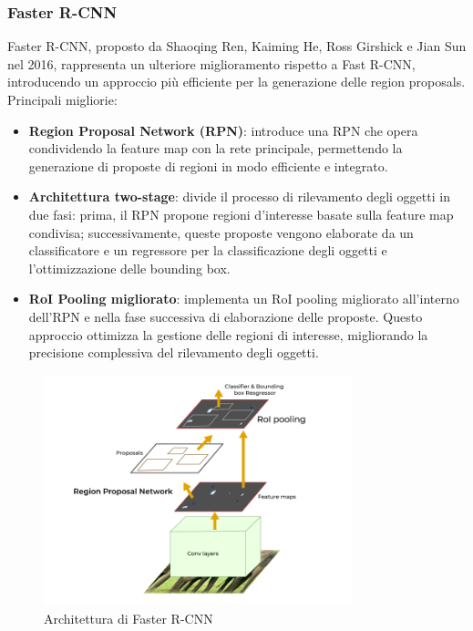 \subsubsection{Faster R-CNN}
Faster R-CNN, proposto da Shaoqing Ren, Kaiming He, Ross Girshick e Jian Sun nel 2016\cite{10}, rappresenta un ulteriore miglioramento rispetto a Fast R-CNN, introducendo un approccio più efficiente per la generazione delle region proposals. Principali migliorie: 

\begin{itemize}
    \item \textbf{Region Proposal Network (RPN)}: introduce una RPN che opera condividendo la feature map con la rete principale, permettendo la generazione di proposte di regioni in modo efficiente e integrato.
    \item \textbf{Architettura two-stage}: divide il processo di rilevamento degli oggetti in due fasi: prima, il RPN propone regioni d'interesse basate sulla feature map condivisa; successivamente, queste proposte vengono elaborate da un classificatore e un regressore per la classificazione degli oggetti e l'ottimizzazione delle bounding box.
    \item \textbf{RoI Pooling migliorato}: implementa un RoI pooling migliorato all'interno dell'RPN e nella fase successiva di elaborazione delle proposte. Questo approccio ottimizza la gestione delle regioni di interesse, migliorando la precisione complessiva del rilevamento degli oggetti.
\end{itemize}

\begin{figure}[ht]
    \centering
    \includegraphics[width=0.8\textwidth]{files/capitoli/1-object-detection/assets/faster-r-cnn.png}
    \caption{\label{fig:faster-r-cnn}Architettura di Faster R-CNN\cite{9}}
\end{figure}


